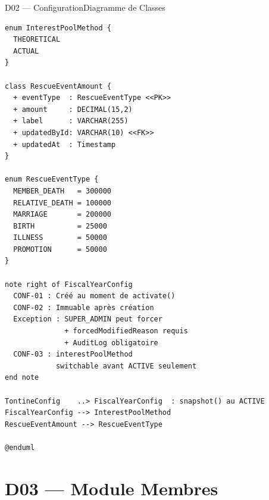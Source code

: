 \documentclass[12pt, a4paper]{report}
\begin{document}
\begin{diagramBox}{D02 — Configuration}{Diagramme de Classes}
\begin{lstlisting}
enum InterestPoolMethod {
  THEORETICAL
  ACTUAL
}

class RescueEventAmount {
  + eventType  : RescueEventType <<PK>>
  + amount     : DECIMAL(15,2)
  + label      : VARCHAR(255)
  + updatedById: VARCHAR(10) <<FK>>
  + updatedAt  : Timestamp
}

enum RescueEventType {
  MEMBER_DEATH   = 300000
  RELATIVE_DEATH = 100000
  MARRIAGE       = 200000
  BIRTH          = 25000
  ILLNESS        = 50000
  PROMOTION      = 50000
}

note right of FiscalYearConfig
  CONF-01 : Créé au moment de activate()
  CONF-02 : Immuable après création
  Exception : SUPER_ADMIN peut forcer
              + forcedModifiedReason requis
              + AuditLog obligatoire
  CONF-03 : interestPoolMethod
            switchable avant ACTIVE seulement
end note

TontineConfig    ..> FiscalYearConfig  : snapshot() au ACTIVE
FiscalYearConfig --> InterestPoolMethod
RescueEventAmount --> RescueEventType

@enduml
\end{lstlisting}
\end{diagramBox}

\section{D03 — Module Membres}
\end{document}
